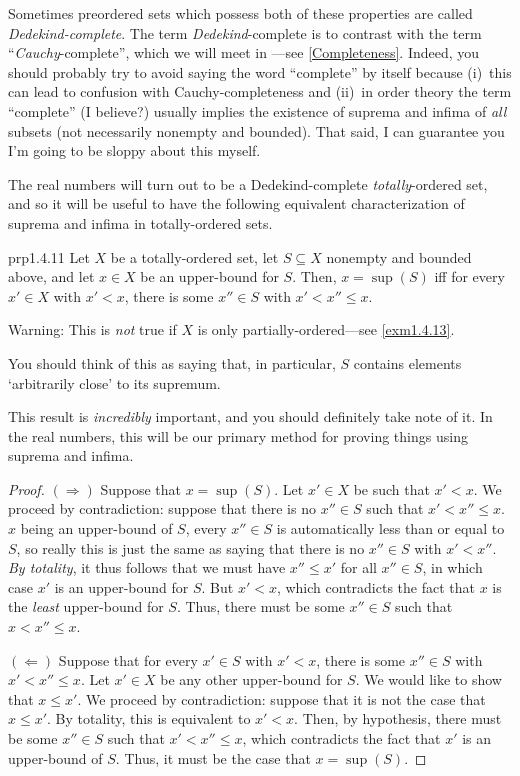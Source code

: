 \begin{rmk}
Sometimes preordered sets which possess both of these properties are called \emph{Dedekind-complete}.  The term \emph{Dedekind}-complete is to contrast with the term ``\emph{Cauchy}-complete'', which we will meet in ---see \cref{Completeness}.  Indeed, you should probably try to avoid saying the word ``complete'' by itself because (i)~this can lead to confusion with Cauchy-completeness and (ii)~in order theory the term ``complete'' (I believe?) usually implies the existence of suprema and infima of \emph{all} subsets (not necessarily nonempty and bounded).  That said, I can guarantee you I'm going to be sloppy about this myself.
\end{rmk}

The real numbers will turn out to be a Dedekind-complete \emph{totally}-ordered set, and so it will be useful to have the following equivalent characterization of suprema and infima in totally-ordered sets.
\begin{prp}{}{prp1.4.11}
Let $X$ be a totally-ordered set, let $S\subseteq X$ nonempty and bounded above, and let $x\in X$ be an upper-bound for $S$.  Then, $x=\sup (S)$ iff for every $x'\in X$ with $x'<x$, there is some $x''\in S$ with $x'<x''\leq x$.
\begin{wrn}
Warning:  This is \emph{not} true if $X$ is only partially-ordered---see \cref{exm1.4.13}.
\end{wrn}
\begin{rmk}
You should think of this as saying that, in particular, $S$ contains elements `arbitrarily close' to its supremum.
\end{rmk}
\begin{rmk}
This result is \emph{incredibly} important, and you should definitely take note of it.  In the real numbers, this will be our primary method for proving things using suprema and infima.
\end{rmk}
\begin{proof}
$(\Rightarrow )$ Suppose that $x=\sup (S)$.  Let $x'\in X$ be such that $x'<x$.  We proceed by contradiction:  suppose that there is no $x''\in S$ such that $x'<x''\leq x$.  $x$ being an upper-bound of $S$, every $x''\in S$ is automatically less than or equal to $S$, so really this is just the same as saying that there is no $x''\in S$ with $x'<x''$.  \emph{By totality}, it thus follows that we must have $x''\leq x'$ for all $x''\in S$, in which case $x'$ is an upper-bound for $S$.  But $x'<x$, which contradicts the fact that $x$ is the \emph{least} upper-bound for $S$.  Thus, there must be some $x''\in S$ such that $x<x''\leq x$.

\blankline
\noindent
$(\Leftarrow )$ Suppose that for every $x'\in S$ with $x'<x$, there is some $x''\in S$ with $x'<x''\leq x$.  Let $x'\in X$ be any other upper-bound for $S$.  We would like to show that $x\leq x'$.  We proceed by contradiction:  suppose that it is not the case that $x\leq x'$.  By totality, this is equivalent to $x'<x$.  Then, by hypothesis, there must be some $x''\in S$ such that $x'<x''\leq x$, which contradicts the fact that $x'$ is an upper-bound of $S$.  Thus, it must be the case that $x=\sup (S)$.
\end{proof}
\end{prp}
